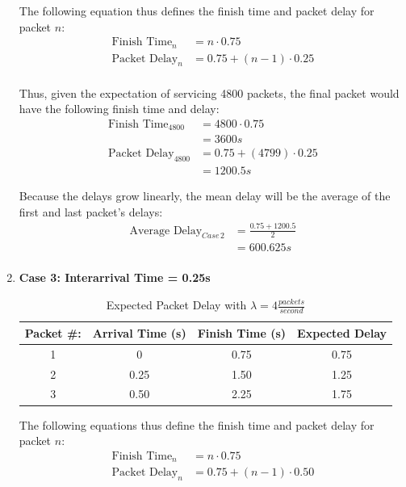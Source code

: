 \documentclass{article}
\begin{document}
\begin{enumerate}
The following equation thus defines the finish time and packet delay for packet $n$:
\begin{align*}
\text{Finish Time}_n &= n \cdot 0.75 \\
\text{Packet Delay}_n &= 0.75 + (n-1) \cdot 0.25 \\
\end{align*}

Thus, given the expectation of servicing 4800 packets, the final packet would have the following finish time and delay:
\begin{align*}
\text{Finish Time}_{4800} &= 4800 \cdot 0.75  \\
						&= 3600s \\
\text{Packet Delay}_{4800} &= 0.75 + (4799) \cdot 0.25  \\
				  &= 1200.5s
\end{align*}

Because the delays grow linearly, the mean delay will be the average of the first and last packet's delays:
\begin{align*}
\text{Average Delay}_{Case \, 2} &= \frac{0.75 + 1200.5}{2} \\
								&= 600.625s \\
\end{align*}

\newpage
\item[] \textbf{Case 3:  Interarrival Time = 0.25s}

	\begin{table}[h!]
		\centering
		\begin{tabular}{|c|c|c|c|} \hline
		\textbf{Packet \#:} & \textbf{Arrival Time (s)} & \textbf{Finish Time (s)} & \textbf{Expected Delay} \\ \hline
		1 & 0 & 0.75 & 0.75 \\ \hline
		2 & 0.25 & 1.50 & 1.25 \\ \hline
		3 & 0.50 & 2.25 & 1.75 \\ \hline
		\end{tabular}
		\caption{Expected Packet Delay with $\lambda = 4 \frac{packets}{second}$}
		\label{Case3_Delay}
	\end{table}

The following equations thus define the finish time and packet delay for packet $n$:
\begin{align*}
\text{Finish Time}_n &= n \cdot 0.75 \\
\text{Packet Delay}_n &= 0.75 + (n-1) \cdot 0.50 \\
\end{align*}


\end{enumerate}
\end{document}
